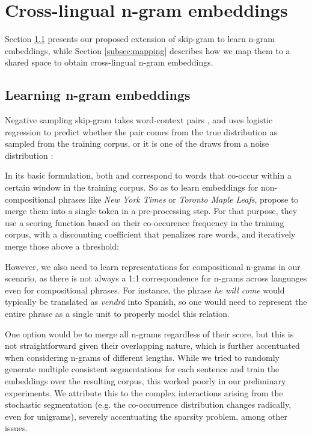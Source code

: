 \documentclass[11pt,a4paper]{article}
\begin{document}
\section{Cross-lingual n-gram embeddings} \label{sec:embeddings}

Section \ref{subsec:phrase_embeddings} presents our proposed extension of skip-gram to learn n-gram embeddings, while Section \ref{subsec:mapping} describes how we map them to a shared space to obtain cross-lingual n-gram embeddings.

\subsection{Learning n-gram embeddings} \label{subsec:phrase_embeddings}
Negative sampling skip-gram takes word-context pairs , and uses logistic regression to predict whether the pair comes from the true distribution as sampled from the training corpus, or it is one of the  draws from a noise distribution \citep{mikolov2013distributed}:


In its basic formulation, both  and  correspond to words that co-occur within a certain window in the training corpus. So as to learn embeddings for non-compositional phrases like \textit{New York Times} or \textit{Toronto Maple Leafs}, \citet{mikolov2013distributed} propose to merge them into a single token in a pre-processing step. For that purpose, they use a  scoring function based on their co-occurence frequency in the training corpus, with a discounting coefficient  that penalizes rare words, and iteratively merge those above a threshold:


However, we also need to learn representations for compositional n-grams in our scenario, as there is not always a 1:1 correspondence for n-grams across languages even for compositional phrases.
For instance, the phrase \textit{he will come} would typically be translated as \textit{vendr\'{a}} into Spanish, so one would need to represent the entire phrase as a single unit to properly model this relation. 

One option would be to merge all n-grams regardless of their score, but this is not straightforward given their overlapping nature, which is further accentuated when considering n-grams of different lengths. While we tried to randomly generate multiple consistent segmentations for each sentence and train the embeddings over the resulting corpus, this worked poorly in our preliminary experiments. We attribute this to the complex interactions arising from the stochastic segmentation (e.g. the co-occurrence distribution changes radically, even for unigrams), severely accentuating the sparsity problem, among other issues.
\end{document}
